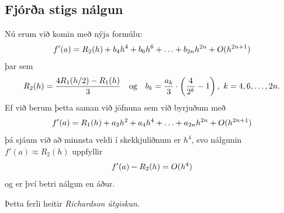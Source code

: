 \documentclass[letterpaper,10pt,icelandic]{sphinxmanual}
\begin{document}
\subsection{Fjórða stigs nálgun}
\label{kafli04:fjora-stigs-nalgun}
Nú erum við komin með nýja formúlu:
\begin{gather}
\begin{split}f'(a) = R_2(h) + b_4 h^4 + b_6 h^6 + \ldots + b_{2n} h^{2n}
  + O(h^{2n+1})\end{split}\notag
\end{gather}
þar sem
\begin{gather}
\begin{split}R_2(h) = \frac{4 R_1(h/2) - R_1(h)}{3}
  \quad \text{og} \quad
  b_k = \frac{a_k}{3} \cdot \left(\frac{4}{2^k}-1\right),
  \  k = 4,6,\ldots,2n.\end{split}\notag
\end{gather}
Ef við berum þetta saman við jöfnuna sem við byrjuðum með
\begin{gather}
\begin{split}f'(a) = R_1(h)
  + a_2 h^2 + a_4 h^4 + \ldots + a_{2n} h^{2n} + O(h^{2n+1})\end{split}\notag
\end{gather}
þá sjáum við að minnsta veldi í skekkjuliðnum er \(h^4\), svo
nálgunin \(f'(a)
\approx R_2(h)\) uppfyllir
\begin{gather}
\begin{split}f'(a) - R_2(h) = O(h^4)\end{split}\notag
\end{gather}
og er því betri nálgun en áður.

Þetta ferli heitir \emph{Richardson útgiskun}.
\end{document}
